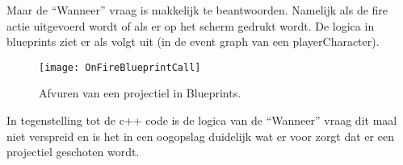 Maar de “Wanneer” vraag is makkelijk te beantwoorden. Namelijk als de fire actie uitgevoerd wordt of als er op het scherm gedrukt wordt. De logica in blueprints ziet er als volgt uit (in de event graph van een playerCharacter).

\begin{figure}[!ht]
  \centering
    \texttt{[image: OnFireBlueprintCall]}
    \caption{Afvuren van een projectiel in Blueprints.}
\end{figure}

In tegenstelling tot de c++ code is de logica van de “Wanneer” vraag dit maal niet verspreid en is het in een oogopslag duidelijk wat er voor zorgt dat er een projectiel geschoten wordt.